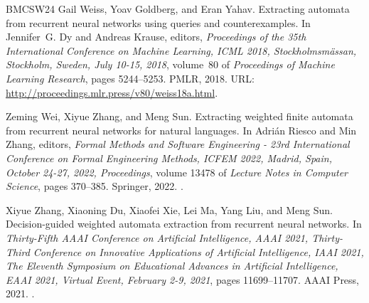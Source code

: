 \documentclass[10pt,a4paper]{amsart}
\theoremstyle{definition}
\numberwithin{equation}{section}
\numberwithin{theorem}{section}
\begin{document}
\begin{thebibliography}{BMCSW24}
Gail Weiss, Yoav Goldberg, and Eran Yahav.
\newblock Extracting automata from recurrent neural networks using queries and
  counterexamples.
\newblock In Jennifer~G. Dy and Andreas Krause, editors, {\em Proceedings of
  the 35th International Conference on Machine Learning, {ICML} 2018,
  Stockholmsm{\"{a}}ssan, Stockholm, Sweden, July 10-15, 2018}, volume~80 of
  {\em Proceedings of Machine Learning Research}, pages 5244--5253. {PMLR},
  2018.
\newblock URL: \url{http://proceedings.mlr.press/v80/weiss18a.html}.

Zeming Wei, Xiyue Zhang, and Meng Sun.
\newblock Extracting weighted finite automata from recurrent neural networks
  for natural languages.
\newblock In Adri{\'{a}}n Riesco and Min Zhang, editors, {\em Formal Methods
  and Software Engineering - 23rd International Conference on Formal
  Engineering Methods, {ICFEM} 2022, Madrid, Spain, October 24-27, 2022,
  Proceedings}, volume 13478 of {\em Lecture Notes in Computer Science}, pages
  370--385. Springer, 2022.
\newblock \href {https://doi.org/10.1007/978-3-031-17244-1\_22}
  {}.

Xiyue Zhang, Xiaoning Du, Xiaofei Xie, Lei Ma, Yang Liu, and Meng Sun.
\newblock Decision-guided weighted automata extraction from recurrent neural
  networks.
\newblock In {\em Thirty-Fifth {AAAI} Conference on Artificial Intelligence,
  {AAAI} 2021, Thirty-Third Conference on Innovative Applications of Artificial
  Intelligence, {IAAI} 2021, The Eleventh Symposium on Educational Advances in
  Artificial Intelligence, {EAAI} 2021, Virtual Event, February 2-9, 2021},
  pages 11699--11707. {AAAI} Press, 2021.
\newblock \href {https://doi.org/10.1609/aaai.v35i13.17391}
  {}.

\end{thebibliography}
\end{document}
